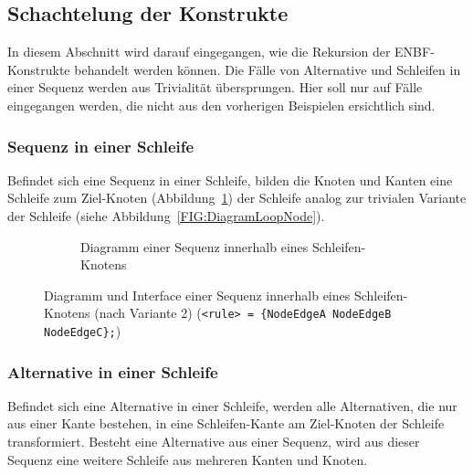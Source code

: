 \documentclass[../InterneDSLs.tex]{subfiles}
\begin{document}
\subsection{Schachtelung der Konstrukte}
In diesem Abschnitt wird darauf eingegangen, wie die Rekursion der ENBF-Konstrukte behandelt werden können. Die Fälle von Alternative und Schleifen in einer Sequenz werden aus Trivialität übersprungen. Hier soll nur auf Fälle eingegangen werden, die nicht aus den vorherigen Beispielen ersichtlich sind.

\subsubsection{Sequenz in einer Schleife}
Befindet sich eine Sequenz in einer Schleife, bilden die Knoten und Kanten eine Schleife zum Ziel-Knoten (Abbildung~\ref{FIG:DiagramSequenceInLoop}) der Schleife analog zur trivialen Variante der Schleife (siehe Abbildung~\ref{FIG:DiagramLoopNode}).
\begin{figure}[ht]
\centering
  \begin{subfigure}[c]{0.49\textwidth}
    \caption{Diagramm einer Sequenz innerhalb eines Schleifen-Knotens}
    \label{FIG:DiagramSequenceInLoop}
  \end{subfigure}
  \begin{subfigure}[c]{0.49\textwidth}
    
  \end{subfigure}
  \caption{Diagramm und Interface einer Sequenz innerhalb eines Schleifen-Knotens (nach Variante 2) (\texttt{<rule> = \{NodeEdgeA NodeEdgeB NodeEdgeC\};})}
  \label{FIG:SequenceInLoop}
\end{figure}

\subsubsection{Alternative in einer Schleife}
Befindet sich eine Alternative in einer Schleife, werden alle Alternativen, die nur aus einer Kante bestehen, in eine Schleifen-Kante am Ziel-Knoten der Schleife transformiert. Besteht eine Alternative aus einer Sequenz, wird aus dieser Sequenz eine weitere Schleife aus mehreren Kanten und Knoten.
\end{document}
